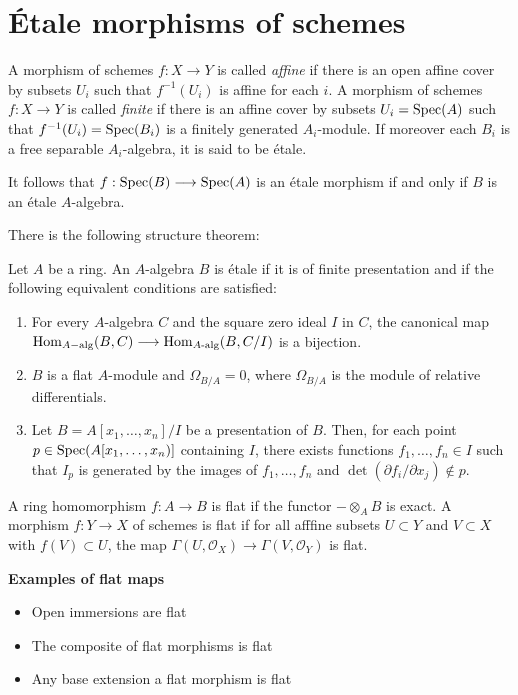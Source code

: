 \section{\'Etale morphisms of schemes}
\begin{definition}
	A morphism of schemes $f: X \to Y$ is called \textit{affine} if there is an open affine cover by subsets $U_i$ such that $f^{-1}(U_i)$ is affine for each $i$. A morphism of schemes $f: X \to Y$ is called \textit{finite} if there is an affine cover by subsets $U_i = \operatorname{Spec}(A)$ such that $f^{-1}(U_i) = \operatorname{Spec}(B_i)$ is a finitely generated $A_i$-module. If moreover each $B_i$ is a free separable $A_i$-algebra, it is said to be \'etale.
\end{definition}
It follows that $f: \operatorname{Spec}(B) \longrightarrow \operatorname{Spec}(A)$ is an \'etale morphism if and only if $B$ is an \'etale $A$-algebra.

There is the following structure theorem:
\begin{theorem}
	Let $A$ be a ring. An $A$-algebra $B$ is \'etale if it is of finite presentation and if the following equivalent conditions are satisfied:
	\begin{enumerate}
		\item For every $A$-algebra $C$ and the square zero ideal $I$ in $C$, the canonical map $\operatorname{Hom}_{A-\text{alg}}(B,C) \longrightarrow \operatorname{Hom}_{A\text{-alg}}(B,C/I)$ is a bijection.
		\item $B$ is a flat $A$-module and $\Omega_{B/A} = 0$, where $\Omega_{B/A}$ is the module of relative differentials.
		\item Let $B = A[x_1, \dots, x_n]/I$ be a presentation of $B$. Then, for each point $p \in \operatorname{Spec}(A[x_1, \dots, x_n)]$ containing $I$, there exists functions $f_1, \dots, f_n \in I$ such that $I_p$ is generated by the images of $f_1, \dots, f_n$ and $\det(\partial f_i/\partial x_j) \not\in p$.
	\end{enumerate}
\end{theorem}


\begin{definition}\label{def:flatness}
	A ring homomorphism $f: A \to B$ is flat if the functor $- \otimes_A B$ is exact. A morphism $f: Y \to X$ of schemes is flat if for all afffine subsets $U \subset Y$ and $V \subset X$ with $f(V) \subset U$, the map $\Gamma(U, \mathcal{O}_X) \to \Gamma(V, \mathcal{O}_Y)$ is flat.
\end{definition}

\textbf{Examples of flat maps}
\begin{itemize}
	\item Open immersions are flat
	\item The composite of flat morphisms is flat
	\item Any base extension a flat morphism is flat
\end{itemize}

